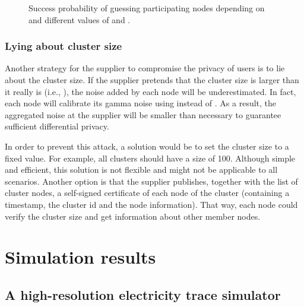 \documentclass[11pt,a4paper]{article}
\theoremstyle{plain}
\theoremstyle{plain}
\theoremstyle{plain}
\theoremstyle{plain}
\theoremstyle{nonumberplain} \theoremseparator{}
\begin{document}
\begin{figure*}[ht]
\centering
{}
\caption{Success probability of guessing participating nodes depending on  and different values of  and .}
\label{fig:adv_succ}
\end{figure*}
 


\subsubsection*{Lying about cluster size}


Another strategy for the supplier to compromise the privacy of users is to lie
about the cluster size. If the supplier pretends that the cluster
size  is larger than it really is (i.e., ), the noise added by 
each node will be underestimated. In fact, each node will calibrate its 
gamma noise using  instead of . As a result, the 
aggregated noise at the supplier will be smaller than necessary to 
guarantee sufficient differential privacy. 

In order to prevent this attack, a solution would be to set the cluster
size to a fixed value. For example, all clusters should have a size of 100.
Although simple and efficient, this solution is not flexible and might
not be applicable to all scenarios. Another option is that the supplier
publishes, together with the list of cluster nodes, a self-signed
certificate of each node of the cluster (containing a timestamp, the cluster id and the node 
information). That way, each node could verify 
the cluster size and get information about other member nodes.


\section{Simulation results}

\subsection{A high-resolution electricity trace simulator}
\end{document}
